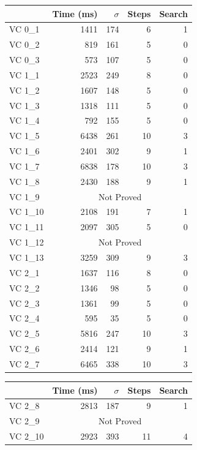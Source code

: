 \begin{figure}[t]
	\centering
	\begin{tabular}{lrrrr}
		\toprule
			& Time (ms)	& $\sigma$& Steps & Search \\
		\midrule
		VC 0\_1	& 1411		& 174 	& 6 	& 1     \\
		VC 0\_2	& 819		& 161	& 5 	& 0     \\
		VC 0\_3	& 573		& 107	& 5 	& 0     \\
		VC 1\_1	& 2523		& 249	& 8 	& 0     \\
		VC 1\_2	& 1607		& 148	& 5	& 0     \\
		VC 1\_3	& 1318		& 111	& 5 	& 0     \\
		VC 1\_4	& 792		& 155	& 5 	& 0     \\
		VC 1\_5	& 6438		& 261	& 10	& 3     \\
		VC 1\_6	& 2401		& 302	& 9 	& 1     \\
		VC 1\_7	& 6838 		& 178	& 10	& 3     \\
		VC 1\_8	& 2430 		& 188	& 9	& 1     \\
		VC 1\_9	& \multicolumn{4}{c}{Not Proved}        \\
		VC 1\_10 & 2108		& 191	& 7 	& 1     \\
		VC 1\_11 & 2097		& 305	& 5 	& 0     \\
		VC 1\_12 & \multicolumn{4}{c}{Not Proved}       \\
		VC 1\_13 & 3259		& 309	& 9	& 3     \\
		VC 2\_1	& 1637		& 116	& 8 	& 0     \\
		VC 2\_2	& 1346		& 98	& 5	& 0     \\
		VC 2\_3	& 1361		& 99	& 5 	& 0     \\
		VC 2\_4	& 595		& 35	& 5 	& 0     \\
		VC 2\_5	& 5816		& 247	& 10	& 3     \\
		VC 2\_6	& 2414		& 121	& 9 	& 1     \\
		VC 2\_7	& 6465 		& 338	& 10	& 3     \\
		\bottomrule
	\end{tabular}
	\quad
	\begin{tabular}{lrrrr}
		\toprule
			& Time (ms)	& $\sigma$& Steps & Search \\
		\midrule
		VC 2\_8	& 2813 		& 187	& 9	& 1     \\
		VC 2\_9	& \multicolumn{4}{c}{Not Proved}        \\
		VC 2\_10 & 2923		& 393	& 11	& 4     \\

\end{tabular}
\end{figure}
